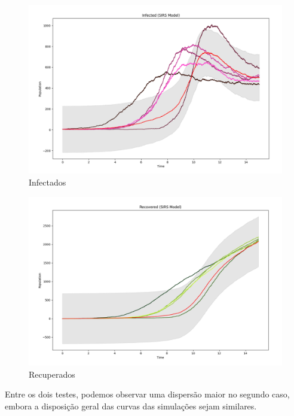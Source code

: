 \documentclass[a4paper, 12pt]{article}
\begin{document}
\begin{itemize}
    \begin{figure}[H]
        \centering
        \includegraphics[width=1\textwidth]{Images/Exercise 5/Scenario 1/i1b.png}
        \vspace*{-1cm}
        \caption{Infectados}
        \label{fig:exampleFig19}
    \end{figure}
    
    \begin{figure}[H]
        \centering
        \includegraphics[width=1\textwidth]{Images/Exercise 5/Scenario 1/r1b.png}
        \vspace*{-1cm}
        \caption{Recuperados}
        \label{fig:exampleFig20}
    \end{figure}
\end{itemize}

Entre os dois testes, podemos observar uma dispersão maior no segundo caso, embora a disposição geral das curvas das simulações sejam similares. 
\end{document}
